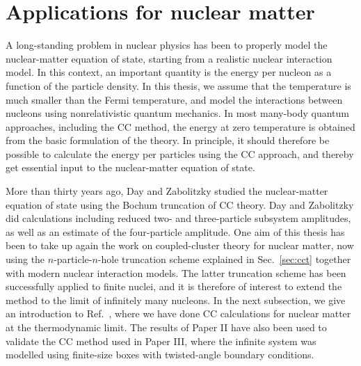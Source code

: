 \documentclass[a4paper,12pt]{report}
\begin{document}


\section{Applications for nuclear matter}



A long-standing problem in nuclear physics \cite{gandolfi2007,
hebeler2011,dickhoff2004,day1967,jackson1983,akmal1998,dalen2010,
baldo2012} 
has been to properly model the nuclear-matter equation of state, 
starting from a realistic nuclear interaction model. In this context,
an important quantity is the energy per nucleon as a function of the 
particle density. In this thesis, we assume that the temperature is
much smaller than the Fermi temperature, and model the interactions
between nucleons using nonrelativistic quantum mechanics. 
In most many-body quantum approaches, including the CC method, the energy 
at zero temperature is obtained from the basic formulation of the theory. 
In principle, it should therefore be possible to calculate the energy per 
particles using the CC approach, and thereby get essential input to the
nuclear-matter equation of state. 

More than thirty years ago, Day and Zabolitzky studied the nuclear-matter
equation of state \cite{day_cc} using the Bochum truncation 
\cite{kummel1978} of CC theory. Day and Zabolitzky did calculations 
including reduced two- and three-particle subsystem amplitudes, 
as well as an estimate of the four-particle amplitude. One aim of this 
thesis has been to take up again the work on coupled-cluster theory for nuclear
matter, now using the $n$-particle-$n$-hole truncation scheme 
explained in Sec.~\ref{sec:cct} together with modern nuclear 
interaction models. The latter truncation scheme has been successfully
applied to finite nuclei, and it is therefore of interest to
extend the method to the limit of infinitely many nucleons. In the
next subsection, we give an introduction to Ref.~\cite{baardsen},
where we have done CC calculations for nuclear matter at the
thermodynamic limit. The results of Paper II have also been
used to validate the CC method used in Paper III, where the
infinite system was modelled using finite-size boxes with 
twisted-angle boundary conditions.  


\end{document}
